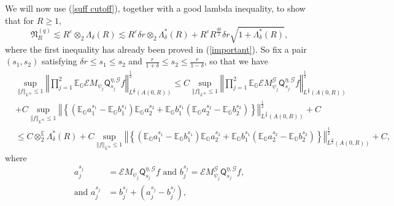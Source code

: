 \documentclass{amsart}%
\theoremstyle{plain}
\numberwithin{equation}{section}
\begin{document}
We will now use (\ref{suff cutoff}), together with a good lambda inequality,
to show that for $R\geq1$,%
\begin{equation}
\mathfrak{N}_{R}^{\left(  q\right)  }\lesssim R^{\varepsilon}\otimes
_{2}\Lambda_{\delta}\left(  R\right)  \lesssim R^{\varepsilon}\delta
r\otimes_{2}\Lambda_{\delta}^{\ast}\left(  R\right)  +R^{\varepsilon}%
R^{\frac{d\delta}{2}}\delta r\sqrt{1+\Lambda_{\delta}^{\ast}\left(  R\right)
},\label{will show}%
\end{equation}
where the first inequality has already been proved in (\ref{important}). So
fix a pair $\left(  s_{1},s_{2}\right)  $ satisfying $\delta r\leq s_{1}\leq
s_{2}$ and $\frac{r}{1+\delta}\leq s_{2}\leq\frac{r}{1-\delta}$, so that we
have
\begin{align}
& \sup_{\left\Vert f\right\Vert _{L^{\infty}}\leq1}\left\Vert \prod_{j=1}%
^{2}\mathbb{E}_{\mathbb{G}}\mathcal{E}M_{\psi_{j}}\mathsf{Q}_{s_{j}}%
^{\eta,\mathcal{G}}f\right\Vert _{L^{\frac{q}{2}}\left(  A\left(  0,R\right)
\right)  }^{\frac{1}{2}}\leq C\sup_{\left\Vert f\right\Vert _{L^{\infty}}%
\leq1}\left\Vert \prod_{j=1}^{2}\mathbb{E}_{\mathbb{G}}\mathcal{E}M_{\psi_{j}%
}^{\mathcal{G}}\mathsf{Q}_{s_{j}}^{\eta,\mathcal{G}}f\right\Vert _{L^{\frac
{q}{2}}\left(  A\left(  0,R\right)  \right)  }^{\frac{1}{2}}\label{satis}\\
& +C\sup_{\left\Vert f\right\Vert _{L^{\infty}}\leq1}\left\Vert \left\{
\left(  \mathbb{E}_{\mathbb{G}}a_{1}^{s_{1}}-\mathbb{E}_{\mathbb{G}}%
b_{1}^{s_{1}}\right)  \mathbb{E}_{\mathbb{G}}a_{2}^{s_{2}}+\mathbb{E}%
_{\mathbb{G}}b_{1}^{s_{1}}\left(  \mathbb{E}_{\mathbb{G}}a_{2}^{s_{2}%
}-\mathbb{E}_{\mathbb{G}}b_{2}^{s_{2}}\right)  \right\}  \right\Vert
_{L^{\frac{q}{2}}\left(  A\left(  0,R\right)  \right)  }^{\frac{1}{2}%
}+C\nonumber\\
& \leq C\otimes_{2}^{\mathbb{E}}\Lambda_{\delta}^{\ast}\left(  R\right)
+C\sup_{\left\Vert f\right\Vert _{L^{\infty}}\leq1}\left\Vert \left\{  \left(
\mathbb{E}_{\mathbb{G}}a_{1}^{s_{1}}-\mathbb{E}_{\mathbb{G}}b_{1}^{s_{1}%
}\right)  \mathbb{E}_{\mathbb{G}}a_{2}^{s_{2}}+\mathbb{E}_{\mathbb{G}}%
b_{1}^{s_{1}}\left(  \mathbb{E}_{\mathbb{G}}a_{2}^{s_{2}}-\mathbb{E}%
_{\mathbb{G}}b_{2}^{s_{2}}\right)  \right\}  \right\Vert _{L^{\frac{q}{2}%
}\left(  A\left(  0,R\right)  \right)  }^{\frac{1}{2}}+C,\nonumber
\end{align}
where%
\begin{align*}
a_{j}^{s_{j}}  & =\mathcal{E}M_{\psi_{j}}\mathsf{Q}_{s_{j}}^{\eta,\mathcal{G}%
}f\text{ and }b_{j}^{s_{j}}=\mathcal{E}M_{\psi_{j}}^{\mathcal{G}}%
\mathsf{Q}_{s_{j}}^{\eta,\mathcal{G}}f,\\
\text{and }a_{j}^{s_{j}}  & =b_{j}^{s_{j}}+\left(  a_{j}^{s_{j}}-b_{j}^{s_{j}%
}\right)  ,
\end{align*}
\end{document}
